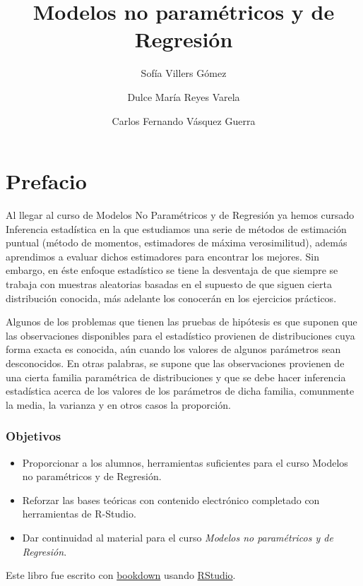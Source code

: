\documentclass[
  a4paper,
  oneside,
  openany]{book}
\title{Modelos no paramétricos y de Regresión}
\author{Sofía Villers Gómez \and Dulce María Reyes Varela \and Carlos Fernando Vásquez Guerra}
\date{}
\begin{document}
\maketitle

{
\setcounter{tocdepth}{2}
\tableofcontents
}
\hypertarget{prefacio}{%
\chapter*{Prefacio}\label{prefacio}}


Al llegar al curso de Modelos No Paramétricos y de Regresión ya hemos cursado Inferencia estadística en la que estudiamos una serie de métodos de estimación puntual (método de momentos, estimadores de máxima verosimilitud), además aprendimos a evaluar dichos estimadores para encontrar los mejores. Sin embargo, en éste enfoque estadístico se tiene la desventaja de que siempre se trabaja con muestras aleatorias basadas en el supuesto de que siguen cierta distribución conocida, más adelante los conocerán en los ejercicios prácticos.

Algunos de los problemas que tienen las pruebas de hipótesis es que suponen que las observaciones disponibles para el estadístico provienen de distribuciones cuya forma exacta es conocida, aún cuando los valores de algunos parámetros sean desconocidos. En otras palabras, se supone que las observaciones provienen de una cierta familia paramétrica de distribuciones y que se debe hacer inferencia estadística acerca de los valores de los parámetros de dicha familia, comunmente la media, la varianza y en otros casos la proporción.

\hypertarget{objetivos}{%
\subsection*{Objetivos}\label{objetivos}}


\begin{itemize}
\item
  Proporcionar a los alumnos, herramientas suficientes para el curso Modelos no paramétricos y de Regresión.
\item
  Reforzar las bases teóricas con contenido electrónico completado con herramientas de R-Studio.
\item
  Dar continuidad al material para el curso \emph{Modelos no paramétricos y de Regresión}.
\end{itemize}

Este libro fue escrito con \href{http://bookdown.org/}{bookdown} usando \href{http://www.rstudio.com/ide/}{RStudio}.
\end{document}
